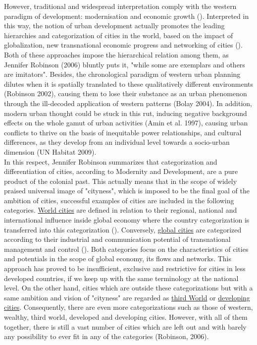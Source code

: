 \documentclass[11pt]{report}
\begin{document}
However, traditional and widespread interpretation comply with the western paradigm of development: modernisation and economic growth (\href{ref}{\citealt{ref}}). Interpreted in this way, the notion of urban development actually promotes the leading hierarchies and categorization of cities in the world, based on the impact of globalization, new transnational  economic  progress  and  networking  of  cities (\href{ref}{\citealt{ref}}). Both of these approaches impose the hierarchical relation among them, as Jennifer Robinson (2006) bluntly puts it, "while some are exemplars and others are imitators". Besides, the chronological paradigm of western urban planning dilutes when it is spatially translated to these qualitatively different environments (Robinson 2002), causing them to lose their substance as an urban phenomenon through the ill-decoded application of western patterns (Bolay 2004). In addition, modern urban thought could be stuck in this rut, inducing negative background effects on the whole gamut of urban activities (Amin et al. 1997), causing urban conflicts to thrive on the basis of inequitable power relationships, and cultural differences, as they develop from an individual level towards a socio-urban dimension (UN Habitat 2009).
\\
In  this  respect,  Jennifer  Robinson  summarizes  that  categorization  and  differentiation  of  cities, according to Modernity and Development, are a pure product of the colonial past. This actually means that in the scope of widely praised universal image of "cityness", which is imposed to be the final goal of the ambition of cities, successful examples of cities are included in the following categories. \underline{World cities} are defined in relation to their regional, national and international influence inside global economy where the country categorization is transferred into this categorization (\href{ref}{\citealt{ref}}). Conversely, \underline{global cities} are categorized according to their industrial and communication potential of transnational management and control (\href{ref}{\citealt{ref}}). Both categories focus on the characteristics of cities and potentials in the scope of global economy, its flows and networks. This approach has proved to be insufficient, exclusive and restrictive for cities in less developed countries, if we keep up with the same terminology at the national level. On the other hand, cities which are outside these categorizations but with a same ambition and vision of "cityness" are regarded as \underline{third World} or \underline{developing cities}. Consequently, there are even more categorizations such as those of western, wealthy, third world, developed and developing cities. However, with all of them together, there is still a vast number of cities which are left out and with barely any possibility to ever fit in any of the categories (Robinson, 2006). 
\end{document}
